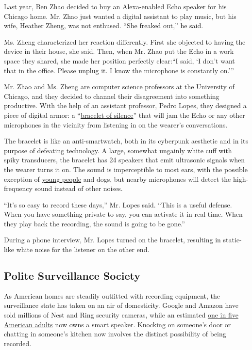 Last year, Ben Zhao decided to buy an Alexa-enabled Echo speaker for his
Chicago home. Mr. Zhao just wanted a digital assistant to play music,
but his wife, Heather Zheng, was not enthused. ``She freaked out,'' he
said.

Ms. Zheng characterized her reaction differently. First she objected to
having the device in their house, she said. Then, when Mr. Zhao put the
Echo in a work space they shared, she made her position perfectly
clear:``I said, `I don't want that in the office. Please unplug it. I
know the microphone is constantly on.'''

Mr. Zhao and Ms. Zheng are computer science professors at the University
of Chicago, and they decided to channel their disagreement into
something productive. With the help of an assistant professor, Pedro
Lopes, they designed a piece of digital armor: a
``\href{http://sandlab.cs.uchicago.edu/jammer/}{bracelet of silence}''
that will jam the Echo or any other microphones in the vicinity from
listening in on the wearer's conversations.

The bracelet is like an anti-smartwatch, both in its cyberpunk aesthetic
and in its purpose of defeating technology. A large, somewhat ungainly
white cuff with spiky transducers, the bracelet has 24 speakers that
emit ultrasonic signals when the wearer turns it on. The sound is
imperceptible to most ears, with the possible exception of
\href{https://www.scientificamerican.com/article/bring-science-home-high-frequency-hearing/}{young
people} and dogs, but nearby microphones will detect the high-frequency
sound instead of other noises.

``It's so easy to record these days,'' Mr. Lopes said. ``This is a
useful defense. When you have something private to say, you can activate
it in real time. When they play back the recording, the sound is going
to be gone.''

During a phone interview, Mr. Lopes turned on the bracelet, resulting in
static-like white noise for the listener on the other end.

\hypertarget{polite-surveillance-society}{%
\subsection{Polite Surveillance
Society}\label{polite-surveillance-society}}

As American homes are steadily outfitted with recording equipment, the
surveillance state has taken on an air of domesticity. Google and Amazon
have sold millions of Nest and Ring security cameras, while an estimated
\href{https://www.nationalpublicmedia.com/insights/reports/smart-audio-report/}{one
in five American adults} now owns a smart speaker. Knocking on someone's
door or chatting in someone's kitchen now involves the distinct
possibility of being recorded.

